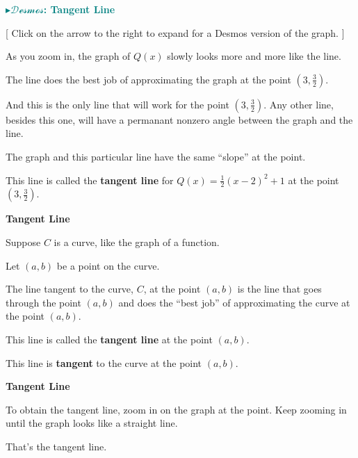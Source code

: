 \documentclass{ximera}
\begin{document}
\begin{onlineOnly}
\textbf{\textcolor{teal}{$\blacktriangleright \mathcal{Desmos}$: Tangent Line}} 
\begin{expandable} 
\begin{center}
\end{center}
\end{expandable}
\end{onlineOnly}
[ Click on the arrow to the right to expand for a Desmos version of the graph. ]





As you zoom in, the graph of $Q(x)$ slowly looks more and more like the line. 


The line does the best job of approximating the graph at the point $\left( 3, \frac{3}{2} \right)$. 


And this is the only line that will work for the point $\left( 3, \frac{3}{2} \right)$.  Any other line, besides this one, will have a permanant nonzero angle between the graph and the line.  

The graph and this particular line have the same ``slope'' at the point. 


This line is called the \textbf{\textcolor{blue!55!black}{tangent line}} for $Q(x) = \frac{1}{2} (x - 2)^2 + 1$ at the point $\left( 3, \frac{3}{2} \right)$.




\begin{definition} \textbf{\textcolor{green!50!black}{Tangent Line}}


Suppose $C$ is a curve, like the graph of a function. 

Let $(a, b)$ be a point on the curve.

The line tangent to the curve, $C$, at the point $(a, b)$ is the line that goes through the point $(a, b)$ and does the ``best job'' of approximating the curve at the point $(a, b)$.

This line is called the \textbf{tangent line} at the point $(a, b)$.

This line is \textbf{tangent} to the curve at the point $(a, b)$.


\end{definition}



\begin{procedure} \textbf{\textcolor{purple!30!blue}{Tangent Line}} 

To obtain the tangent line, zoom in on the graph at the point. Keep zooming in until the graph looks like a straight line.

That's the tangent line.



\end{procedure}
\end{document}

